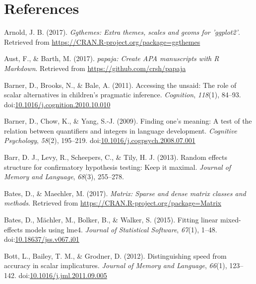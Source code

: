 \documentclass[man]{apa6}
\theoremstyle{definition}
\theoremstyle{definition}
\theoremstyle{definition}
\theoremstyle{remark}
\begin{document}
\newpage

\section{References}\label{references}

\setlength{\parindent}{-0.5in} \setlength{\leftskip}{0.5in}

\hypertarget{refs}{}
\hypertarget{ref-R-ggthemes}{}
Arnold, J. B. (2017). \emph{Ggthemes: Extra themes, scales and geoms for
'ggplot2'}. Retrieved from
\url{https://CRAN.R-project.org/package=ggthemes}

\hypertarget{ref-R-papaja}{}
Aust, F., \& Barth, M. (2017). \emph{papaja: Create APA manuscripts with
R Markdown}. Retrieved from \url{https://github.com/crsh/papaja}

\hypertarget{ref-barner2011}{}
Barner, D., Brooks, N., \& Bale, A. (2011). Accessing the unsaid: The
role of scalar alternatives in children's pragmatic inference.
\emph{Cognition}, \emph{118}(1), 84--93.
doi:\href{https://doi.org/10.1016/j.cognition.2010.10.010}{10.1016/j.cognition.2010.10.010}

\hypertarget{ref-barner2009}{}
Barner, D., Chow, K., \& Yang, S.-J. (2009). Finding one's meaning: A
test of the relation between quantifiers and integers in language
development. \emph{Cognitive Psychology}, \emph{58}(2), 195--219.
doi:\href{https://doi.org/10.1016/j.cogpsych.2008.07.001}{10.1016/j.cogpsych.2008.07.001}

\hypertarget{ref-barr2013random}{}
Barr, D. J., Levy, R., Scheepers, C., \& Tily, H. J. (2013). Random
effects structure for confirmatory hypothesis testing: Keep it maximal.
\emph{Journal of Memory and Language}, \emph{68}(3), 255--278.

\hypertarget{ref-R-Matrix}{}
Bates, D., \& Maechler, M. (2017). \emph{Matrix: Sparse and dense matrix
classes and methods}. Retrieved from
\url{https://CRAN.R-project.org/package=Matrix}

\hypertarget{ref-R-lme4}{}
Bates, D., Mächler, M., Bolker, B., \& Walker, S. (2015). Fitting linear
mixed-effects models using lme4. \emph{Journal of Statistical Software},
\emph{67}(1), 1--48.
doi:\href{https://doi.org/10.18637/jss.v067.i01}{10.18637/jss.v067.i01}

\hypertarget{ref-bott2012}{}
Bott, L., Bailey, T. M., \& Grodner, D. (2012). Distinguishing speed
from accuracy in scalar implicatures. \emph{Journal of Memory and
Language}, \emph{66}(1), 123--142.
doi:\href{https://doi.org/10.1016/j.jml.2011.09.005}{10.1016/j.jml.2011.09.005}
\end{document}

